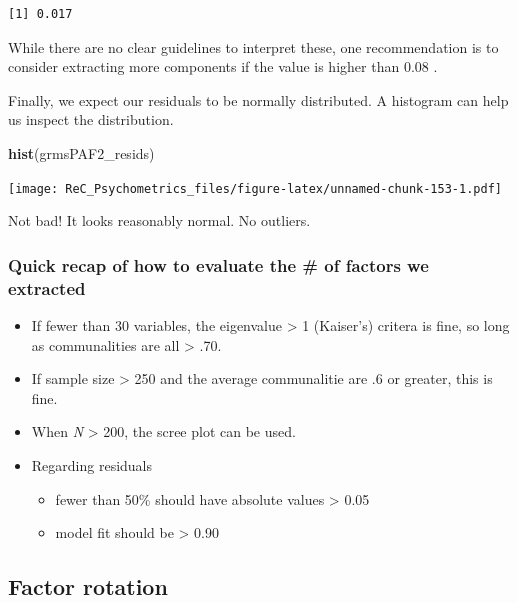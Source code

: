 \documentclass[
  english,
]{book}
\newenvironment{Shaded}{\begin{snugshade}}{\end{snugshade}}
\newcommand{\KeywordTok}[1]{\textcolor[rgb]{0.13,0.29,0.53}{\textbf{#1}}}
\newcommand{\NormalTok}[1]{#1}
\providecommand{\tightlist}{%
  \setlength{\itemsep}{0pt}\setlength{\parskip}{0pt}}
\begin{document}
\begin{verbatim}
[1] 0.017
\end{verbatim}

While there are no clear guidelines to interpret these, one recommendation is to consider extracting more components if the value is higher than 0.08 \citep{field_discovering_2012}.

Finally, we expect our residuals to be normally distributed. A histogram can help us inspect the distribution.

\begin{Shaded}
\begin{Highlighting}[]
\KeywordTok{hist}\NormalTok{(grmsPAF2_resids)}
\end{Highlighting}
\end{Shaded}

\texttt{[image: ReC\_Psychometrics\_files/figure-latex/unnamed-chunk-153-1.pdf]}

Not bad! It looks reasonably normal. No outliers.

\hypertarget{quick-recap-of-how-to-evaluate-the-of-factors-we-extracted}{%
\subsubsection{Quick recap of how to evaluate the \# of factors we extracted}\label{quick-recap-of-how-to-evaluate-the-of-factors-we-extracted}}

\begin{itemize}
\tightlist
\item
  If fewer than 30 variables, the eigenvalue \textgreater{} 1 (Kaiser's) critera is fine, so long as communalities are all \textgreater{} .70.
\item
  If sample size \textgreater{} 250 and the average communalitie are .6 or greater, this is fine.
\item
  When \emph{N} \textgreater{} 200, the scree plot can be used.
\item
  Regarding residuals

  \begin{itemize}
  \tightlist
  \item
    fewer than 50\% should have absolute values \textgreater{} 0.05
  \item
    model fit should be \textgreater{} 0.90
  \end{itemize}
\end{itemize}

\hypertarget{factor-rotation}{%
\subsection{Factor rotation}\label{factor-rotation}}
\end{document}
